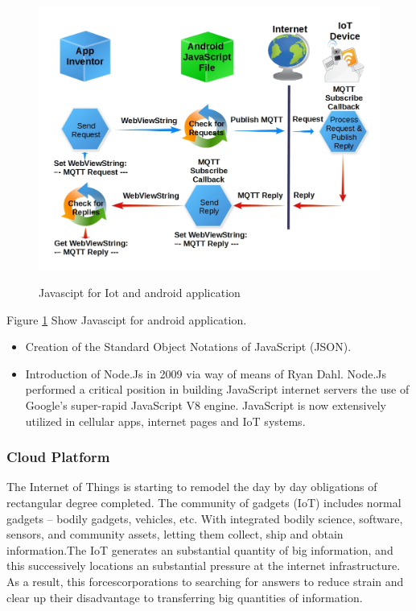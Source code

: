 \documentclass[12pt,a4paper]{article}
\begin{document}
\begin{figure}[H]
	\centering
	\includegraphics[width=\linewidth]{blockdiagram-1.jpg}\\
	\caption{Javascipt for Iot and android application}
	\label{fig:3.2.1}
\end{figure}
\begin{center}
Figure \ref{fig:3.2.1} Show Javascipt for android application.
\end{center}

\begin{itemize}
	\item Creation of the Standard Object Notations of JavaScript (JSON).
	\item Introduction of Node.Js in 2009 via way of means of Ryan Dahl. Node.Js performed a critical position in building
JavaScript internet servers the use of Google’s super-rapid JavaScript V8 engine. JavaScript is now
extensively utilized in cellular apps, internet pages and IoT systems.
\end{itemize}

\subsubsection{Cloud Platform}
\hspace{0.5cm} The Internet of Things is starting to remodel the day by day obligations of rectangular degree completed. The
community of gadgets (IoT) includes normal gadgets – bodily gadgets, vehicles, etc.
With integrated bodily science, software, sensors, and community assets, letting them collect,
ship and obtain information.The IoT generates an substantial quantity of big information, and
this successively locations an substantial pressure at the internet infrastructure. As a result, this forcescorporations to searching for answers to reduce strain and clear up their disadvantage to transferring
big quantities of information.\\
\end{document}
